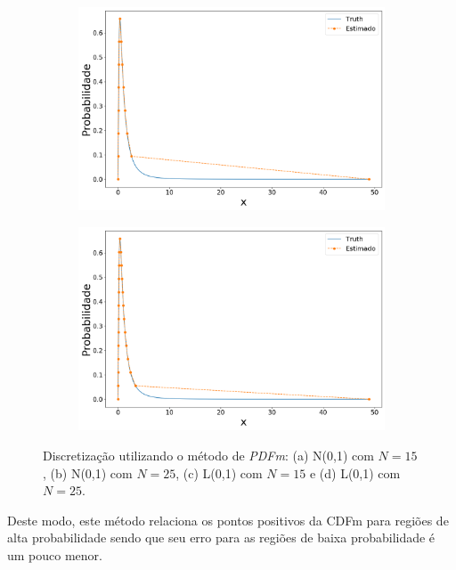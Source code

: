 \begin{figure}[H]
	\begin{subfigure}[b]{0.45\textwidth}
		\centering 
		\includegraphics[width=\linewidth]{./figuras/PDFm_lognormal_15_1}
		\caption{}
		\label{fig:pdflognorm15}
	\end{subfigure}
	\hfill
	\begin{subfigure}[b]{0.45\textwidth}
		\centering 
		\includegraphics[width=\linewidth]{./figuras/PDFm_lognormal_25_1}
		\caption{}
		\label{fig:pdflognorm25}
	\end{subfigure}
	
	\caption{Discretização utilizando o método de \textit{PDFm}: (a) N(0,1) com $N = 15$, (b) N(0,1) com $N = 25$, (c) L(0,1) com $N = 15$ e (d) L(0,1) com $N = 25$.}
	\label{fig:pdfmnorm}
\end{figure}

Deste modo, este método relaciona os pontos positivos da \ac{CDFm} para regiões de alta probabilidade sendo que seu erro para as regiões de baixa probabilidade é um pouco menor.

